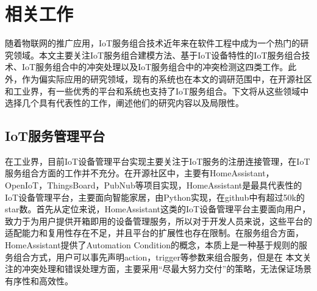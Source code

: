 \documentclass[winfonts,master,twoside]{njuthesis}
\begin{document}
\chapter{相关工作}
随着物联网的推广应用，IoT服务组合技术近年来在软件工程中成为一个热门的研究领域。本文主要关注IoT服务组合建模方法、基于IoT设备特性的IoT服务组合技术、IoT服务组合中的冲突处理以及IoT服务组合中的冲突检测这四类工作。此外，作为偏实际应用的研究领域，现有的系统也在本文的调研范围中，在开源社区和工业界，有一些优秀的平台和系统也支持了IoT服务组合。下文将从这些领域中选择几个具有代表性的工作，阐述他们的研究内容以及局限性。

\section{IoT服务管理平台}
在工业界，目前IoT设备管理平台实现主要关注于IoT服务的注册连接管理，在IoT服务组合方面的工作并不充分\cite{aoudia2019service}。在开源社区中，主要有HomeAssistant\cite{homeassistant}，OpenIoT\cite{soldatos2015openiot}，ThingsBoard\cite{thingsboard}，PubNub\cite{arunarduino}等项目实现，HomeAssistant是最具代表性的IoT设备管理平台，主要面向智能家居，由Python实现，在github中有超过50k的star数。首先从定位来说，HomeAssistant这类的IoT设备管理平台主要面向用户，致力于为用户提供开箱即用的设备管理服务，所以对于开发人员来说，这些平台的适配能力和复用性存在不足，并且平台的扩展性也存在限制。在服务组合方面，HomeAssistant提供了Automation Condition的概念，本质上是一种基于规则的服务组合方式，用户可以事先声明action，trigger等参数来组合服务，但是在
本文关注的冲突处理和错误处理方面，主要采用“尽最大努力交付”\cite{besteffort}的策略，无法保证场景有序性和高效性。
\end{document}
